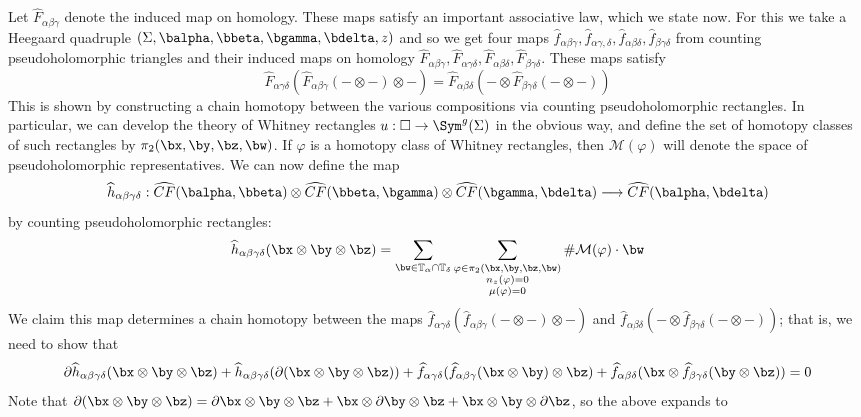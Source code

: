 Let $\widehat{F}_{\alpha\beta\gamma}$ denote the induced map on homology. These maps satisfy an important associative law, which we state now. For this we take a Heegaard quadruple $(\Sigma,\balpha,\bbeta,\bgamma,\bdelta,z)$ and so we get four maps $\widehat{f}_{\alpha\beta\gamma},\widehat{f}_{\alpha\gamma,\delta},\widehat{f}_{\alpha\beta\delta},\widehat{f}_{\beta\gamma\delta}$ from counting pseudoholomorphic triangles and their induced maps on homology $\widehat{F}_{\alpha\beta\gamma},\widehat{F}_{\alpha\gamma\delta},\widehat{F}_{\alpha\beta\delta},\widehat{F}_{\beta\gamma\delta}$. These maps satisfy
\[ \widehat{F}_{\alpha\gamma\delta}(\widehat{F}_{\alpha\beta\gamma}(- \otimes -) \otimes -) = \widehat{F}_{\alpha\beta\delta}(- \otimes \widehat{F}_{\beta\gamma\delta}(- \otimes -)) \]
This is shown by constructing a chain homotopy between the various compositions via counting pseudoholomorphic rectangles. In particular, we can develop the theory of Whitney rectangles $u : \square \rightarrow \Sym^g(\Sigma)$ in the obvious way, and define the set of homotopy classes of such rectangles by $\pi_2(\bx,\by,\bz,\bw)$. If $\varphi$ is a homotopy class of Whitney rectangles, then $\mathcal M(\varphi)$ will denote the space of pseudoholomorphic representatives. We can now define the map
\[ \widehat{h}_{\alpha\beta\gamma\delta} : \widehat{CF}(\balpha,\bbeta) \otimes \widehat{CF}(\bbeta,\bgamma) \otimes \widehat{CF}(\bgamma,\bdelta) \longrightarrow \widehat{CF}(\balpha,\bdelta) \]
by counting pseudoholomorphic rectangles:
\[ \widehat{h}_{\alpha\beta\gamma\delta}(\bx \otimes \by \otimes \bz) = \sum_{\bw \in \mathbb T_\alpha \cap \mathbb T_\delta} \sum_{\substack{\varphi \in \pi_2(\bx,\by,\bz,\bw) \\ n_z(\varphi)=0 \\ \mu(\varphi)=0}} \# \mathcal M(\varphi) \cdot \bw \]
We claim this map determines a chain homotopy between the maps $\widehat{f}_{\alpha\gamma\delta}(\widehat{f}_{\alpha\beta\gamma}(- \otimes -) \otimes -)$ and $\widehat{f}_{\alpha\beta\delta}(- \otimes \widehat{f}_{\beta\gamma\delta}(- \otimes -))$; that is, we need to show that 
\[ \partial \widehat{h}_{\alpha\beta\gamma\delta}(\bx\otimes\by\otimes\bz) + \widehat{h}_{\alpha\beta\gamma\delta}(\partial(\bx\otimes\by\otimes\bz)) + \widehat{f}_{\alpha\gamma\delta}(\widehat{f}_{\alpha\beta\gamma}(\bx\otimes\by) \otimes \bz) + \widehat{f}_{\alpha\beta\delta}(\bx \otimes \widehat{f}_{\beta\gamma\delta}(\by \otimes \bz)) = 0 \]
Note that $\partial(\bx\otimes\by\otimes\bz)=\partial\bx\otimes\by\otimes\bz+\bx\otimes\partial\by\otimes\bz+\bx\otimes\by\otimes\partial\bz$, so the above expands to 

